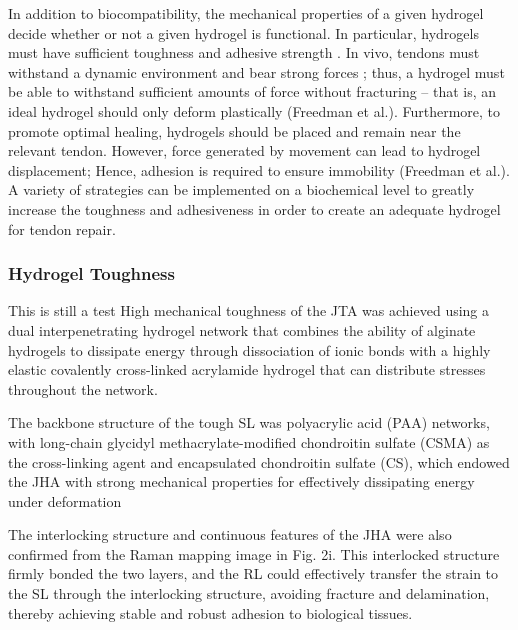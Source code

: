 In addition to biocompatibility, the mechanical properties of a given hydrogel decide whether or not a given hydrogel is functional. In particular, hydrogels must have sufficient toughness and adhesive strength \autocite{Freedman.EnhancedTendonHealing}. In vivo, tendons must withstand a dynamic environment and bear strong forces \autocite{Chen.AdvancesApplicationHydrogel}; thus, a hydrogel must be able to withstand sufficient amounts of force without fracturing – that is, an ideal hydrogel should only deform plastically (Freedman et al.). Furthermore, to promote optimal healing, hydrogels should be placed and remain near the relevant tendon. However, force generated by movement can lead to hydrogel displacement; Hence, adhesion is required to ensure immobility (Freedman et al.). A variety of strategies can be implemented on a biochemical level to greatly increase the toughness and adhesiveness in order to create an adequate hydrogel for tendon repair.

\subsubsection{Hydrogel Toughness}
This is still a test
High mechanical toughness of the JTA was achieved using a dual interpenetrating hydrogel network that combines the ability of alginate hydrogels to dissipate energy through dissociation of ionic bonds with a highly elastic covalently cross-linked acrylamide hydrogel that can distribute stresses throughout the network. \cite{FreedmanEnhancedTendonHealing}

The backbone structure of the tough SL was polyacrylic acid (PAA) networks, with long-chain glycidyl methacrylate-modified chondroitin sulfate (CSMA) as the cross-linking agent and encapsulated chondroitin sulfate (CS), which endowed the JHA with strong mechanical properties for effectively dissipating energy under deformation \cite{JuSurfaceEnzymePolymerization}

The interlocking structure and continuous features of the JHA were also confirmed from the Raman mapping image in Fig. 2i. This interlocked structure firmly bonded the two layers, and the RL could effectively transfer the strain to the SL through the interlocking structure, avoiding fracture and delamination, thereby achieving stable and robust adhesion to biological tissues. \cite{JuSurfaceEnzymePolymerization}




